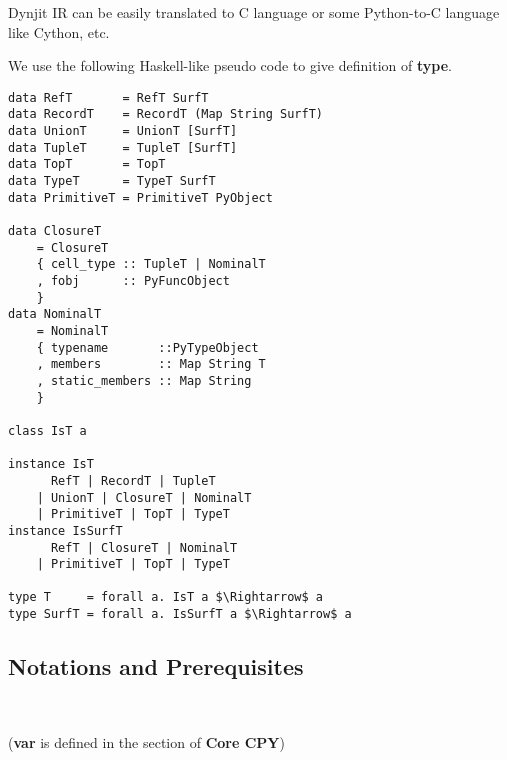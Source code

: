 \documentclass[12pt, a4paper]{report}
\begin{document}
Dynjit IR can be easily translated to C language or some Python-to-C language like Cython, etc.

We use the following Haskell-like pseudo code to give definition of \textbf{type}.
\lstset{language=Haskell, showlines=true, mathescape=true}
\begin{lstlisting}
data RefT       = RefT SurfT
data RecordT    = RecordT (Map String SurfT)
data UnionT     = UnionT [SurfT]
data TupleT     = TupleT [SurfT]
data TopT       = TopT
data TypeT      = TypeT SurfT
data PrimitiveT = PrimitiveT PyObject

data ClosureT
    = ClosureT 
    { cell_type :: TupleT | NominalT
    , fobj      :: PyFuncObject
    }
data NominalT
    = NominalT 
    { typename       ::PyTypeObject
    , members        :: Map String T
    , static_members :: Map String
    }

class IsT a

instance IsT
      RefT | RecordT | TupleT 
    | UnionT | ClosureT | NominalT
    | PrimitiveT | TopT | TypeT
instance IsSurfT
      RefT | ClosureT | NominalT
    | PrimitiveT | TopT | TypeT

type T     = forall a. IsT a $\Rightarrow$ a
type SurfT = forall a. IsSurfT a $\Rightarrow$ a

\end{lstlisting}

\lstset{language=Python, showlines=true}

\subsection*{Notations and Prerequisites}

\begin{bnf*}
    \\
\end{bnf*}
(\textbf{var} is defined in the section of \textbf{Core CPY})
\end{document}
